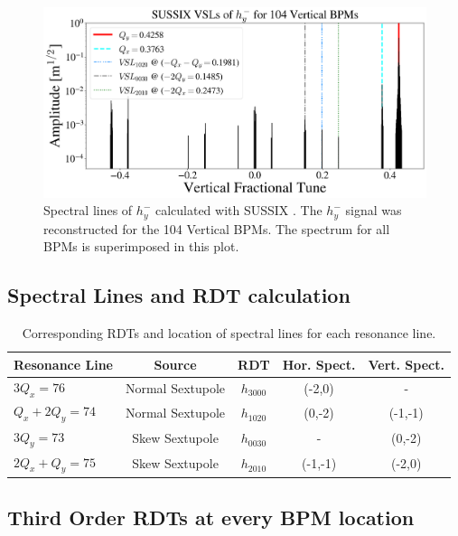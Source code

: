 \begin{figure}[H]
    \centering
    \includegraphics[width=\columnwidth]{chapter4/hyspect.png}
    \caption{Spectral lines of $h_y^{-}$ calculated with SUSSIX \cite{sussix}. The $h_y^{-}$ signal was reconstructed for the 104 Vertical BPMs. The spectrum for all BPMs is superimposed in this plot.}
    \label{fig:hyspect1}
\end{figure}

\subsection{Spectral Lines and RDT calculation}

\begin{table}[H]
    \centering
    \caption{Corresponding RDTs and location of spectral lines for each resonance line.}
    \begin{tabular}{lcccc}
        \toprule
        \textbf{Resonance Line} & \textbf{Source} & \textbf{RDT} & \textbf{Hor. Spect.} & \textbf{Vert. Spect.} \\
        \midrule
            $3Q_x=76$     & Normal Sextupole    & $h_{3000}$           &  (-2,0)  & -       \\ %
           $Q_x+2Q_y=74$   & Normal Sextupole    & $h_{1020}$            & (0,-2) & (-1,-1)       \\ %
            $3Q_y=73$     & Skew Sextupole   & $h_{0030}$           & - & (0,-2)        \\ %
            $2Q_x+Q_y=75$   & Skew Sextupole    & $h_{2010}$     & (-1,-1) & (-2,0)       \\
        \bottomrule
    \end{tabular}
    \label{tab:rdtlines}
\end{table}

\subsection{Third Order RDTs at every BPM location}

